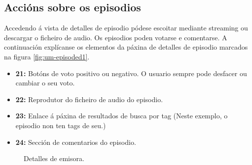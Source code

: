 \subsection{Accións sobre os episodios}

Accedendo á vista de detalles de episodio pódese escoitar mediante streaming ou descargar o ficheiro de audio. Os episodios poden votarse e comentarse.  A continuación explícanse os elementos da páxina de detalles de episodio marcados na figura \ref{fig:um-episoded1}.

\begin{itemize}
	\item \textbf{21:} Botóns de voto positivo ou negativo. O usuario sempre pode desfacer ou cambiar o seu voto.
	\item \textbf{22:} Reprodutor do ficheiro de audio do episodio.
	\item \textbf{23:} Enlace á páxina de resultados de busca por tag (Neste exemplo, o episodio non ten tags de seu.)
	\item \textbf{24:} Sección de comentarios do episodio.
\end{itemize}

\begin{figure}[H]
	\centering
	\caption{Detalles de emisora.}
	\label{fig:um-stationd1}
\end{figure}

